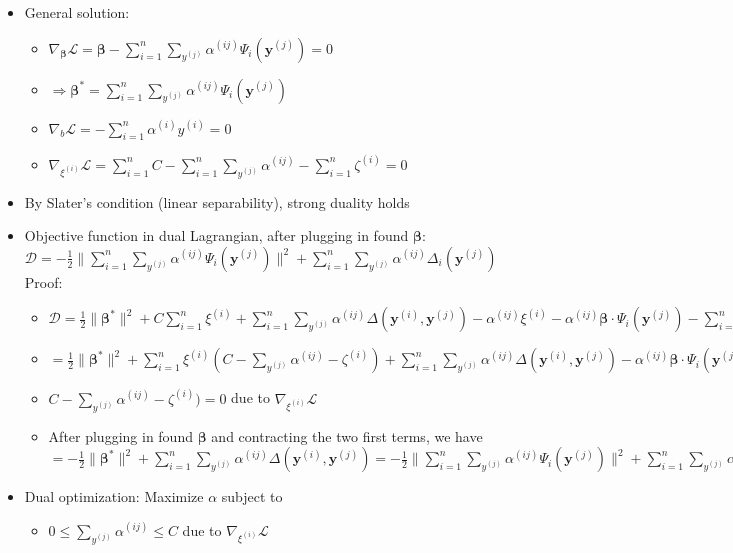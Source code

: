 \begin{itemize}
    \item General solution:
    \begin{itemize}
        \item $\nabla_{\boldsymbol{\beta}} \mathcal{L} = \boldsymbol{\beta} - \sum_{i=1}^n \sum_{y^{(j)}} \alpha^{(ij)} \Psi_i(\boldsymbol{y}^{(j)}) = 0$
        \item $\Rightarrow \boldsymbol{\beta}^{*} = \sum_{i=1}^n \sum_{y^{(j)}} \alpha^{(ij)} \Psi_i(\boldsymbol{y}^{(j)})$
        \item $\nabla_b \mathcal{L} = - \sum_{i=1}^n \alpha^{(i)} y^{(i)} = 0$
        \item $\nabla_{\xi^{(i)}} \mathcal{L} = \sum_{i=1}^n C - \sum_{i=1}^n \sum_{y^{(j)}} \alpha^{(ij)} - \sum_{i=1}^n \zeta^{(i)} = 0$
    \end{itemize}
    \item By Slater's condition (linear separability), strong duality holds
    \item Objective function in dual Lagrangian, after plugging in found $\boldsymbol{\beta}$: $\mathcal{D} = -\frac{1}{2} \| \sum_{i=1}^n \sum_{y^{(j)}} \alpha^{(ij)} \Psi_i(\boldsymbol{y}^{(j)}) \|^2 + \sum_{i=1}^n \sum_{y^{(j)}} \alpha^{(ij)} \Delta_i(\boldsymbol{y}^{(j)})$\\
    Proof:
    \begin{itemize}
        \item $\mathcal{D} = \frac{1}{2} \| \boldsymbol{\beta}^* \|^2 + C \sum_{i=1}^n \xi^{(i)} + \sum_{i=1}^n \sum_{y^{(j)}} \alpha^{(ij)} \Delta(\boldsymbol{y}^{(i)},\boldsymbol{y}^{(j)}) - \alpha^{(ij)}\xi^{(i)} - \alpha^{(ij)} \boldsymbol{\beta} \cdot \Psi_i(\boldsymbol{y}^{(j)}) - \sum_{i=1}^n \zeta^{(i)} \xi^{(i)}$
        \item $= \frac{1}{2} \| \boldsymbol{\beta}^* \|^2 +  \sum_{i=1}^n \xi^{(i)} ( C - \sum_{y^{(j)}} \alpha^{(ij)} - \zeta^{(i)}) + \sum_{i=1}^n \sum_{y^{(j)}} \alpha^{(ij)} \Delta(\boldsymbol{y}^{(i)},\boldsymbol{y}^{(j)}) - \alpha^{(ij)} \boldsymbol{\beta} \cdot \Psi_i(\boldsymbol{y}^{(j)})$
        \item $ C - \sum_{y^{(j)}} \alpha^{(ij)} - \zeta^{(i)}) = 0$ due to $\nabla_{\xi^{(i)}} \mathcal{L}$
        \item After plugging in found $\boldsymbol{\beta}$ and contracting the two first terms, we have $= -\frac{1}{2} \| \boldsymbol{\beta}^* \|^2 +  \sum_{i=1}^n \sum_{y^{(j)}} \alpha^{(ij)} \Delta(\boldsymbol{y}^{(i)},\boldsymbol{y}^{(j)}) = -\frac{1}{2} \| \sum_{i=1}^n \sum_{y^{(j)}} \alpha^{(ij)} \Psi_i(\boldsymbol{y}^{(j)}) \|^2 + \sum_{i=1}^n \sum_{y^{(j)}} \alpha^{(ij)} \Delta_i(\boldsymbol{y}^{(j)})$
    \end{itemize}
    \item Dual optimization: Maximize $\alpha$ subject to 
    \begin{itemize}
        \item $0 \leq \sum_{y^{(j)}} \alpha^{(ij)} \leq C$ due to $\nabla_{\xi^{(i)}} \mathcal{L}$ 
    \end{itemize}
\end{itemize}

